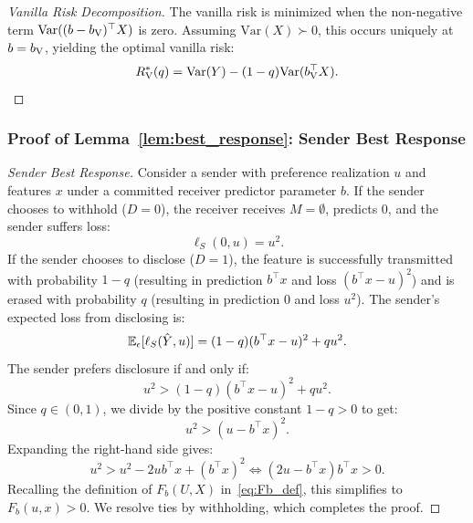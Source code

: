\begin{proof}[Vanilla Risk Decomposition]
The vanilla risk is minimized when the non-negative term $\mathrm{Var}((b - b_{\mathrm{V}})^\top X)$ is zero. Assuming $\mathrm{Var}(X) \succ 0$, this occurs uniquely at $b = b_{\mathrm{V}}$, yielding the optimal vanilla risk:
\begin{equation}
    R_{\mathrm{V}}^*(q) = \mathrm{Var}(Y) - (1 - q)\mathrm{Var}(b_{\mathrm{V}}^\top X).
\end{equation}
\end{proof}

\subsubsection*{Proof of Lemma~\ref{lem:best_response}: Sender Best Response}
\label{app:proof_best_response}
\begin{proof}[Sender Best Response]
Consider a sender with preference realization $u$ and features $x$ under a committed receiver predictor parameter $b$. 
If the sender chooses to withhold ($D = 0$), the receiver receives $M = \emptyset$, predicts $0$, and the sender suffers loss:
\begin{equation}
    \ell_S(0, u) = u^2.
\end{equation}
If the sender chooses to disclose ($D = 1$), the feature is successfully transmitted with probability $1 - q$ (resulting in prediction $b^\top x$ and loss $(b^\top x - u)^2$) and is erased with probability $q$ (resulting in prediction $0$ and loss $u^2$). The sender's expected loss from disclosing is:
\begin{equation}
    \mathbb{E}_{\epsilon}[\ell_S(\hat{Y}, u)] = (1 - q)(b^\top x - u)^2 + q u^2.
\end{equation}
The sender prefers disclosure if and only if:
\begin{equation}
    u^2 > (1 - q)(b^\top x - u)^2 + q u^2.
\end{equation}
Since $q \in (0, 1)$, we divide by the positive constant $1 - q > 0$ to get:
\begin{equation}
    u^2 > (u - b^\top x)^2.
\end{equation}
Expanding the right-hand side gives:
\begin{equation}
    u^2 > u^2 - 2u b^\top x + (b^\top x)^2 \iff (2u - b^\top x)b^\top x > 0.
\end{equation}
Recalling the definition of $F_b(U, X)$ in~\eqref{eq:Fb_def}, this simplifies to $F_b(u, x) > 0$. We resolve ties by withholding, which completes the proof.
\end{proof}

